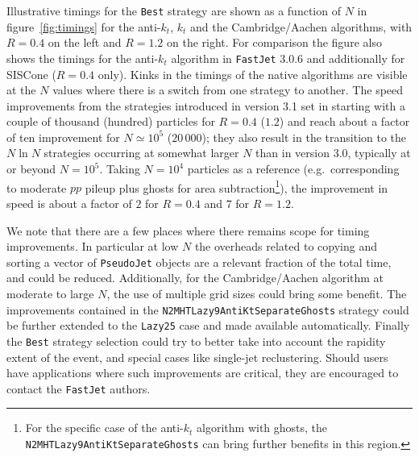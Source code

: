 \documentclass[12pt,a4]{article}
\newcommand{\fastjet}{\texttt{FastJet}\xspace}
\newcommand{\ttt}[1]{{\small\texttt{#1}}}
\newcommand{\order}[1]{{\cal O}\left(#1\right)}
\begin{document}
Illustrative timings for the \ttt{Best} strategy are shown as a
function of $N$ in figure~\ref{fig:timings} for the anti-$k_t$, $k_t$
and the Cambridge/Aachen algorithms, with $R=0.4$ on the left and
$R=1.2$ on the right.
%
For comparison the figure also shows the timings for the anti-$k_t$
algorithm in \fastjet 3.0.6 and additionally for SISCone ($R=0.4$ only).
%
Kinks in the timings of the native algorithms are visible at the $N$
values where there is a switch from one strategy to another.
%
%
%
The speed improvements from the strategies introduced in version
3.1 set in starting with a couple of thousand (hundred) particles for
$R=0.4$ ($1.2$) and reach about a factor of ten improvement for
$N\simeq 10^5$ ($20\,000$); they also result in the transition to the
$N\ln N$ strategies occurring at somewhat larger $N$ than in version
3.0, typically at or beyond $N=10^5$.
%
%
Taking $N=10^4$ particles as a reference (e.g.\ corresponding to moderate
$pp$ pileup plus ghosts for area subtraction\footnote{For the specific
  case of the anti-$k_t$ algorithm with ghosts, the
  \ttt{N2MHTLazy9AntiKtSeparateGhosts} can bring further benefits in
  this region.}), the improvement in speed is about a factor of $2$
for $R=0.4$ and $7$ for $R=1.2$.

We note that there are a few places where there remains scope for
timing improvements. 
%
In particular at low $N$ the overheads related to copying and sorting
a vector of \ttt{PseudoJet} objects are a relevant fraction of the
total time, and could be reduced.
%
Additionally, for the Cambridge/Aachen algorithm at moderate to large
$N$, the use of multiple grid sizes could bring some 
benefit.
%
The improvements contained in the \ttt{N2MHTLazy9AntiKtSeparateGhosts}
strategy could be further extended to the \ttt{Lazy25} case and made
available automatically.
%
Finally the \ttt{Best} strategy selection could try to better take
into account the rapidity extent of the event, and special cases like
single-jet reclustering.
% 
%
Should users have applications where such improvements are
critical, they are encouraged to contact the \fastjet authors.
\end{document}
